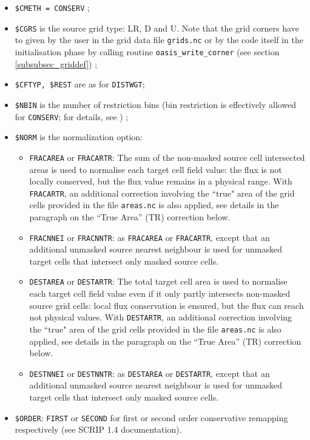 \begin{itemize}
    \begin{itemize}
    \item {\tt \$CMETH = CONSERV} ;
    \item {\tt \$CGRS} is the source grid type: LR, D and U. Note that
      the grid corners have to given by the user in the grid data file
      {\tt grids.nc} or by the code itself in the initialisation phase
      by calling routine {\tt oasis\_write\_corner} (see section
      \ref{subsubsec_griddef}) ;
    \item {\tt \$CFTYP, \$REST} are as for {\tt DISTWGT};
    \item {\tt \$NBIN} is the number of restriction bins (bin restriction is effectively allowed for {\tt CONSERV}; for details, see \citep{piacentini08}) ;
    \item {\tt \$NORM} is the normalization option:
      \begin{itemize}
       \item {\tt FRACAREA} or {\tt FRACARTR}: The sum of the non-masked source cell
        intersected areas is used to normalise each target cell field
        value: the flux is not locally conserved, but the flux value
        remains in a physical range. With {\tt FRACARTR}, an additional correction involving the ``true" area of the grid cells
        provided in the file {\tt areas.nc} is also applied, see details in the paragraph on the ``True Area'' (TR) correction below.
      \item {\tt FRACNNEI} or {\tt FRACNNTR}: as {\tt FRACAREA} or {\tt FRACARTR}, except that an additional unmasked source nearest neighbour is used for unmasked
        target cells that intersect only masked source cells.
       \item {\tt DESTAREA} or {\tt DESTARTR}: The total target cell area is used to
        normalise each target cell field value even if it only partly
        intersects non-masked source grid cells: local flux
        conservation is ensured, but the flux can reach not physical values. With {\tt DESTARTR}, an additional correction involving the ``true" area of the grid cells
        provided in the file {\tt areas.nc} is also applied, see details in the paragraph on the ``True Area'' (TR) correction below.
      \item {\tt DESTNNEI} or {\tt DESTNNTR}: as {\tt DESTAREA} or {\tt DESTARTR}, except that an additional unmasked source nearest neighbour is used for unmasked
        target cells that intersect only masked source cells.
      \end{itemize}
    \item {\tt \$ORDER}: {\tt FIRST} or {\tt SECOND} for first or
      second order conservative remapping respectively (see SCRIP 1.4
      documentation).


\end{itemize}
\end{itemize}
